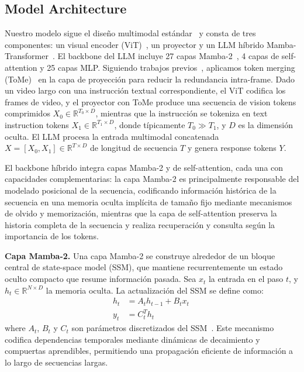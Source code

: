 \documentclass[10pt,twocolumn,letterpaper]{article}
\begin{document}
\subsection{Model Architecture}
\label{subsec:hybrid_structure}
Nuestro modelo sigue el diseño multimodal estándar~\cite{liu2023llava} y consta de tres componentes: un visual encoder (ViT)~\cite{zhai2023siglip}, un proyector y un LLM híbrido Mamba-Transformer~\cite{basant2025nanov2}. El backbone del LLM incluye 27 capas Mamba-2~\cite{dao2024mamba2}, 4 capas de self-attention y 25 capas MLP.
Siguiendo trabajos previos~\cite{zohar2025apollo,li2024videochatflash}, aplicamos token merging (ToMe)~\cite{bolya2022tokenmerge} en la capa de proyección para reducir la redundancia intra-frame. 
Dado un video largo con una instrucción textual correspondiente, el ViT codifica los frames de video, y el proyector con ToMe produce una secuencia de vision tokens comprimidos $X_0\in\mathbb{R}^{T_0\times D}$, mientras que la instrucción se tokeniza en text instruction tokens $X_1\in\mathbb{R}^{T_1\times D}$,
donde típicamente $T_0 \gg T_1$, y $D$ es la dimensión oculta.
El LLM procesa la entrada multimodal concatenada $X=[X_0, X_1]\in\mathbb{R}^{T\times D}$ de longitud de secuencia $T$ y genera response tokens $Y$.

El backbone híbrido integra capas Mamba-2 y de self-attention, cada una con capacidades complementarias: 
la capa Mamba-2 es principalmente responsable del modelado posicional de la secuencia, codificando información histórica de la secuencia en una memoria oculta implícita de tamaño fijo mediante mecanismos de olvido y memorización, mientras que la capa de self-attention preserva la historia completa de la secuencia y realiza recuperación y consulta según la importancia de los tokens.

\noindent\textbf{Capa Mamba-2.} 
Una capa Mamba-2 se construye alrededor de un bloque central de state-space model (SSM), que mantiene recurrentemente un estado oculto compacto que resume información pasada. 
Sea $x_t$ la entrada en el paso $t$, y $h_t\in\mathbb{R}^{N\times D}$ la memoria oculta. La actualización del SSM se define como:
\begin{equation}
    \begin{split}
        h_{t} &= A_{t} h_{t-1} + B_{t} x_{t}\ \\
        y_{t} &= C_{t}^T h_{t}\
    \end{split}
\label{eq:ssm}
\end{equation}
where $A_t$, $B_t$ y $C_t$ son parámetros discretizados del SSM~\cite{dao2024mamba2}.
Este mecanismo codifica dependencias temporales mediante dinámicas de decaimiento y compuertas aprendibles, permitiendo una propagación eficiente de información a lo largo de secuencias largas. 
\end{document}
